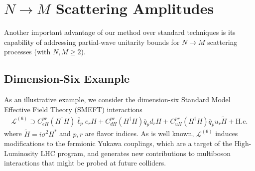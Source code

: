 \section{\texorpdfstring{$N \to M$ Scattering Amplitudes}{N-to-M Scattering Amplitudes}\label{sec:PWUBNtoM}}

Another important advantage of our method over standard techniques 
is its capability of addressing partial-wave unitarity 
bounds for $N \to M$ scattering processes (with $N,M \geq 2$).

\subsection{Dimension-Six Example}

As an illustrative example, we consider the dimension-six 
Standard Model Effective Field Theory (SMEFT) interactions~\cite{Grzadkowski:2010es}
\begin{align}
    \mathcal L^{(6)} \supset 
    C_{eH}^{pr}\left (H^\dagger H\right)\overline \ell_p e_r H + 
    C_{dH}^{pr}\left (H^\dagger H\right)\overline q_p d_r H  
     + C_{uH}^{pr}\left(H^\dagger H\right)\overline q_p u_r \widetilde H + \text{H.c.}
    \label{eq:SMEFT_6}
\end{align}
%
where $\widetilde H = i \sigma^2 H^*$ and $p,r$ are flavor indices.
As is well known, $\mathcal L^{(6)}$ induces modifications to the fermionic Yukawa couplings, which are a target of the High-Luminosity LHC program, and generates new contributions to multiboson interactions that might be probed at future colliders.

